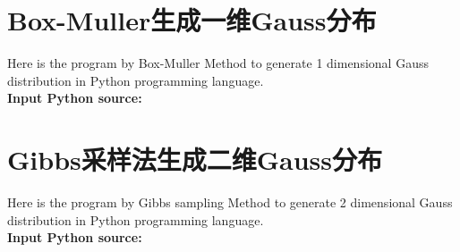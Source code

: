 \documentclass[twoside,twocolumn]{article}
\begin{document}
\begin{CJK*}{UTF8}{gkai}
\begin{appendices}
\section{Box-Muller生成一维Gauss分布}
Here is the program by Box-Muller Method to generate 1 dimensional Gauss distribution in Python programming language.\\
\textbf{\textcolor[rgb]{0.98,0.00,0.00}{Input Python source:}}

\newpage
\section{Gibbs采样法生成二维Gauss分布}
Here is the program by Gibbs sampling Method to generate 2 dimensional Gauss distribution in Python programming language.\\
\textbf{\textcolor[rgb]{0.98,0.00,0.00}{Input Python source:}}

\end{appendices}



\end{CJK*}
\end{document}
